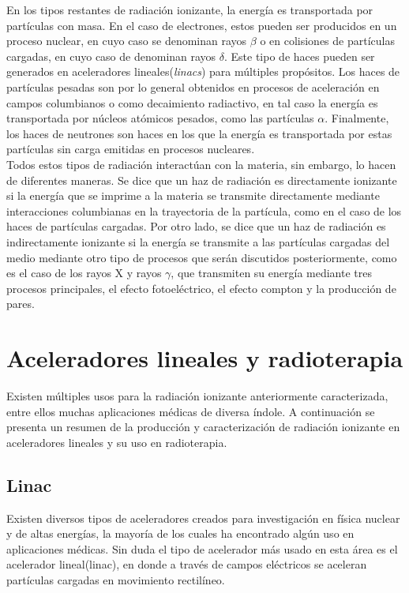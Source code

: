 En los tipos restantes de radiación ionizante, la energía es transportada por partículas con masa. En el caso de electrones, estos pueden ser producidos en un proceso nuclear, en cuyo caso se denominan rayos $\beta$ o en colisiones de partículas cargadas, en cuyo caso de denominan rayos $\delta$. Este tipo de haces pueden ser generados en aceleradores lineales(\textit{linacs}) para múltiples propósitos. Los haces de partículas pesadas son por lo general obtenidos en procesos de aceleración en campos columbianos o como decaimiento radiactivo, en tal caso la energía es transportada por núcleos atómicos pesados, como las partículas $\alpha$. Finalmente, los haces de neutrones son haces en los que la energía es transportada por estas partículas sin carga emitidas en procesos nucleares. \\

Todos estos tipos de radiación interactúan con la materia, sin embargo, lo hacen de diferentes maneras. Se dice que un haz de radiación es directamente ionizante si la energía que se imprime a la materia se transmite directamente mediante interacciones columbianas en la trayectoria de la partícula, como en el caso de los haces de partículas cargadas. Por otro lado, se dice que un haz de radiación es indirectamente ionizante si la energía se transmite a las partículas cargadas del medio mediante otro tipo de procesos que serán discutidos posteriormente, como es el caso de los rayos X y rayos $\gamma$, que transmiten su energía mediante tres procesos principales, el efecto fotoeléctrico, el efecto compton y la producción de pares.\\

\section{Aceleradores lineales y radioterapia}
Existen múltiples usos para la radiación ionizante anteriormente caracterizada, entre ellos muchas aplicaciones médicas de diversa índole. A continuación se presenta un resumen de la producción y caracterización de radiación ionizante en aceleradores lineales y su uso en radioterapia. 
\subsection{Linac}
Existen diversos tipos de aceleradores creados para investigación en física nuclear y de altas energías, la mayoría de los cuales ha encontrado algún uso en aplicaciones médicas. Sin duda el tipo de acelerador más usado en esta área es el acelerador lineal(linac), en donde a través de campos eléctricos se aceleran partículas cargadas en movimiento rectilíneo. \\

